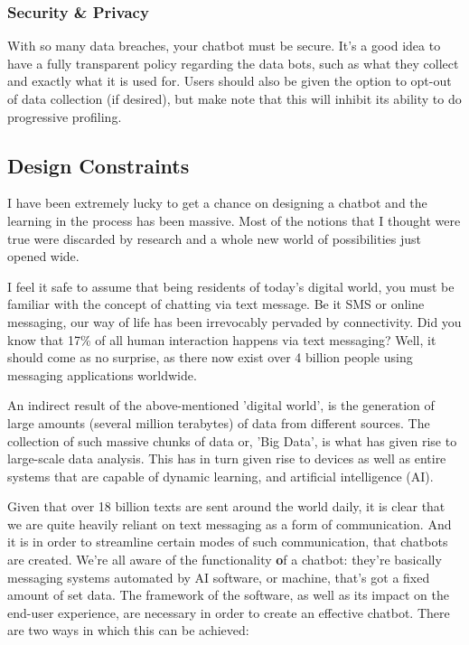 \documentclass[14pt]{extarticle}
\begin{document}
\subsubsection {Security \& Privacy}

With so many data breaches, your chatbot must be secure. It's a good idea to have a fully transparent policy regarding the data bots, such as what they collect and exactly what it is used for. Users should also be given the option to opt-out of data collection (if desired), but make note that this will inhibit its ability to do progressive profiling.

\subsection{Design Constraints}

I have been extremely lucky to get a chance on designing a chatbot and the learning in the process has been massive. Most of the notions that I thought were true were discarded by research and a whole new world of possibilities just opened wide.

I feel it safe to assume that being residents of today's digital world, you must be familiar with the concept of chatting via text message. Be it SMS or online messaging, our way of life has been irrevocably pervaded by connectivity. Did you know that 17\% of all human interaction happens via text messaging? Well, it should come as no surprise, as there now exist over 4 billion people using messaging applications worldwide.

An indirect result of the above-mentioned 'digital world', is the generation of large amounts (several million terabytes) of data from different sources. The collection of such massive chunks of data or, 'Big Data', is what has given rise to large-scale data analysis. This has in turn given rise to devices as well as entire systems that are capable of dynamic learning, and artificial intelligence (AI).

Given that over 18 billion texts are sent around the world daily, it is clear that we are quite heavily reliant on text messaging as a form of communication. And it is in order to streamline certain modes of such communication, that chatbots are created. We're all aware of the functionality \textbf of a chatbot: they're basically messaging systems automated by AI software, or machine, that's got a fixed amount of set data. The framework of the software, as well as its impact on the end-user experience, are necessary in order to create an effective chatbot. There are two ways in which this can be achieved:
\end{document}
